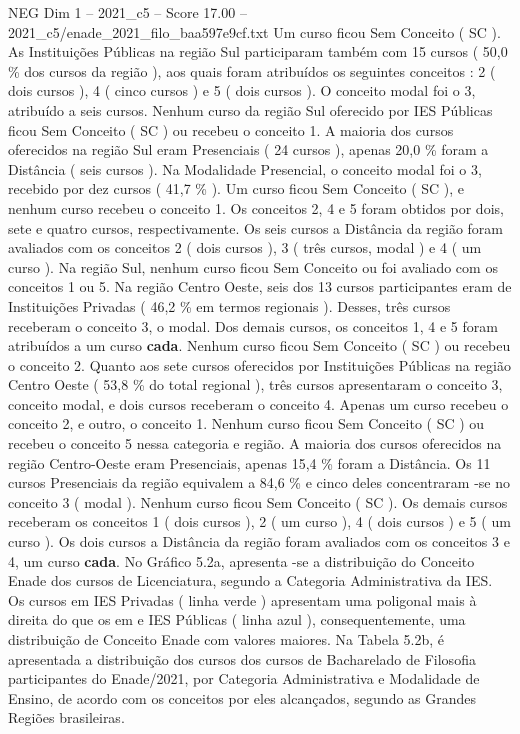 \begin{textsample}{NEG Dim 1 – 2021\_c5 – Score 17.00 – 2021\_c5/enade\_2021\_filo\_baa597e9cf.txt}
Um curso ficou Sem Conceito ( SC ).
As Instituições Públicas na região Sul participaram também com 15 cursos ( 50,0 \% dos cursos da região ), aos quais foram atribuídos os seguintes conceitos : 2 ( dois cursos ), 4 ( cinco cursos ) e 5 ( dois cursos ).
O conceito modal foi o 3, atribuído a seis cursos.
Nenhum curso da região Sul oferecido por IES Públicas ficou Sem Conceito ( SC ) ou recebeu o conceito 1.
A maioria dos cursos oferecidos na região Sul eram Presenciais ( 24 cursos ), apenas 20,0 \% foram a Distância ( seis cursos ).
Na Modalidade Presencial, o conceito modal foi o 3, recebido por dez cursos ( 41,7 \% ).
Um curso ficou Sem Conceito ( SC ), e nenhum curso recebeu o conceito 1.
Os conceitos 2, 4 e 5 foram obtidos por dois, sete e quatro cursos, respectivamente.
Os seis cursos a Distância da região foram avaliados com os conceitos 2 ( dois cursos ), 3 ( três cursos, modal ) e 4 ( um curso ).
Na região Sul, nenhum curso ficou Sem Conceito ou foi avaliado com os conceitos 1 ou 5.
Na região Centro Oeste, seis dos 13 cursos participantes eram de Instituições Privadas ( 46,2 \% em termos regionais ).
Desses, três cursos receberam o conceito 3, o modal.
Dos demais cursos, os conceitos 1, 4 e 5 foram atribuídos a um curso \textbf{cada}.
Nenhum curso ficou Sem Conceito ( SC ) ou recebeu o conceito 2.
Quanto aos sete cursos oferecidos por Instituições Públicas na região Centro Oeste ( 53,8 \% do total regional ), três cursos apresentaram o conceito 3, conceito modal, e dois cursos receberam o conceito 4.
Apenas um curso recebeu o conceito 2, e outro, o conceito 1.
Nenhum curso ficou Sem Conceito ( SC ) ou recebeu o conceito 5 nessa categoria e região.
A maioria dos cursos oferecidos na região Centro-Oeste eram Presenciais, apenas 15,4 \% foram a Distância.
Os 11 cursos Presenciais da região equivalem a 84,6 \% e cinco deles concentraram -se no conceito 3 ( modal ).
Nenhum curso ficou Sem Conceito ( SC ).
Os demais cursos receberam os conceitos 1 ( dois cursos ), 2 ( um curso ), 4 ( dois cursos ) e 5 ( um curso ).
Os dois cursos a Distância da região foram avaliados com os conceitos 3 e 4, um curso \textbf{cada}.
No Gráfico 5.2a, apresenta -se a distribuição do Conceito Enade dos cursos de Licenciatura, segundo a Categoria Administrativa da IES.
Os cursos em IES Privadas ( linha verde ) apresentam uma poligonal mais à direita do que os em e IES Públicas ( linha azul ), consequentemente, uma distribuição de Conceito Enade com valores maiores.
Na Tabela 5.2b, é apresentada a distribuição dos cursos dos cursos de Bacharelado de Filosofia participantes do Enade/2021, por Categoria Administrativa e Modalidade de Ensino, de acordo com os conceitos por eles alcançados, segundo as Grandes Regiões brasileiras.

\end{textsample}
